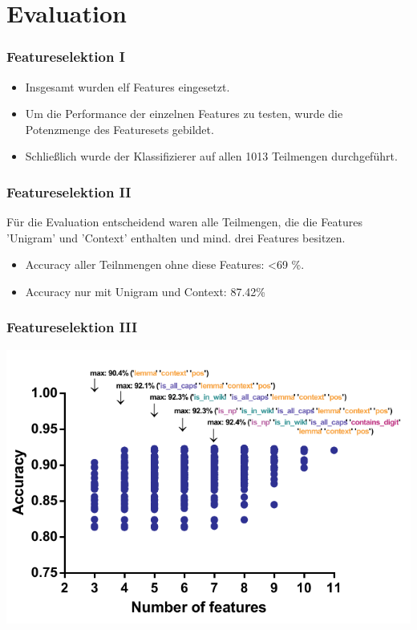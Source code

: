 \documentclass{beamer}
\begin{document}
\section{Evaluation}
	\begin{frame}
		\frametitle{Featureselektion I}
		\begin{itemize}
			\item <+->Insgesamt wurden elf Features eingesetzt.\\
			
			\item <+->Um die Performance der einzelnen Features zu testen, wurde die Potenzmenge des Featuresets gebildet.\\
			
			\item <+->Schließlich wurde der Klassifizierer auf allen 1013 Teilmengen durchgeführt.\\
		\end{itemize}
		
	\end{frame}
	\begin{frame}
		\frametitle{Featureselektion II}
			Für die Evaluation entscheidend waren alle Teilmengen, die die Features 'Unigram' und 'Context' enthalten und mind. drei Features besitzen.\\
					
			\begin{itemize}
				\item Accuracy aller Teilnmengen ohne diese Features: \textless 69 \%.
				\item Accuracy nur mit Unigram und Context: 87.42\%
			\end{itemize}

					
	\end{frame}
		\begin{frame}
			\frametitle{Featureselektion III}
			\includegraphics[scale=0.9]{accuracy.pdf}\\

		\end{frame}
\end{document}
